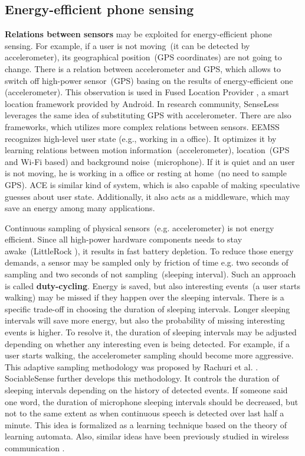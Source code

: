 \subsection{Energy-efficient phone sensing}
\textbf{Relations between sensors} may be exploited for energy-efficient phone sensing. For example, if a user is not moving\ (it can be detected by accelerometer), its geographical position\ (GPS coordinates) are not going to change. There is a relation between accelerometer and GPS, which allows to switch off high-power sensor\ (GPS) basing on the results of energy-efficient one (accelerometer). This observation is used in Fused Location Provider \cite{android:locationapi}, a smart location framework provided by Android. In research community, SenseLess \cite{benabdesslem:senseless} leverages the same idea of substituting GPS with accelerometer. There are also frameworks, which utilizes more complex relations between sensors. EEMSS \cite{wang:eemss} recognizes high-level user state (e.g., working in a office). It optimizes it by learning relations between motion information\ (accelerometer), location\ (GPS and Wi-Fi based) and background noise\ (microphone). If it is quiet and an user is not moving, he is working in a office or resting at home\ (no need to sample GPS). ACE \cite{nath:ace} is similar kind of system, which is also capable of making speculative guesses about user state. Additionally, it also acts as a middleware, which may save an energy among many applications.

Continuous sampling of physical sensors\ (e.g. accelerometer) is not energy efficient. Since all high-power hardware components needs to stay awake\ (LittleRock \cite{priyantha:littlerock}), it results in fast battery depletion. To reduce those energy demands, a sensor may be sampled only by friction of time e.g. two seconds of sampling and two seconds of not sampling\ (sleeping interval). Such an approach is called \textbf{duty-cycling}. Energy is saved, but also interesting events\ (a user starts walking) may be missed if they happen over the sleeping intervals. There is a specific trade-off in choosing the duration of sleeping intervals. Longer sleeping intervals will save more energy, but also the probability of missing interesting events is higher. To resolve it, the duration of sleeping intervals may be adjusted depending on whether any interesting even is being detected. For example, if a user starts walking, the accelerometer sampling should become more aggressive. This adaptive sampling methodology was proposed by Rachuri et al. \cite{rachuri:dynamicsensing}. SociableSense \cite{rachuri:socialsense} further develops this methodology.  It controls the duration of sleeping intervals depending on the history of detected events. If someone said one word, the duration of microphone sleeping intervals should be decreased, but not to the same extent as when continuous speech is detected over last half a minute. This idea is formalized as a learning technique based on the theory of learning automata. Also, similar ideas have been previously studied in wireless communication \cite{deshpande:channeling} \cite{deshpande:refocusing} \cite{deshpande:coordinated}.

